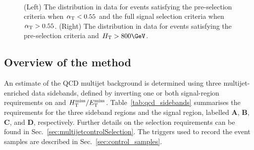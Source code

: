 \begin{figure}[!h]
 \centering
  \\
 \caption{(Left) The \alphat distribution in data for events
   satisfying the pre-selection criteria when $\alpha_{\text{T}} < 0.55$ and the
   full signal selection criteria when $\alpha_{\text{T}} > 0.55$. (Right) The
   \bdphi distribution in data for events satisfying the pre-selection
   criteria and $\scalht > 800\GeV$. }%
 \label{fig:alphat_bdphi_distr}
\end{figure}

\subsection{Overview of the method}
\label{sec:qcdMethod}

An estimate of the QCD multijet background is determined using three
multijet-enriched data sidebands, defined by inverting one or both
signal-region requirements on \bdphi and
$\mbox{$H_{\rm T}^{\rm miss}$}/\mbox{$E_\text{T}^{\rm miss}$}$. Table~\ref{tab:qcd_sidebands} summarises the requirements
for the three sideband regions and the signal region, labelled
\textbf{A}, \textbf{B}, \textbf{C}, and \textbf{D},
respectively. Further details on the selection requirements can be
found in Sec.~\ref{sec:multijetcontrolSelection}. The triggers used to
record the event samples are described in
Sec.~\ref{sec:control_samples}.

